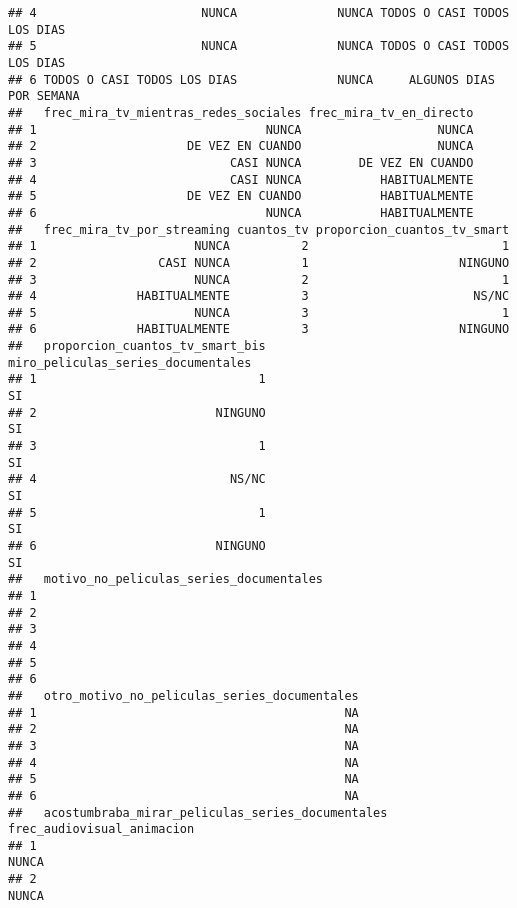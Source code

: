 \documentclass[
]{article}
\begin{document}
\begin{verbatim}
## 4                       NUNCA              NUNCA TODOS O CASI TODOS LOS DIAS
## 5                       NUNCA              NUNCA TODOS O CASI TODOS LOS DIAS
## 6 TODOS O CASI TODOS LOS DIAS              NUNCA     ALGUNOS DIAS POR SEMANA
##   frec_mira_tv_mientras_redes_sociales frec_mira_tv_en_directo
## 1                                NUNCA                   NUNCA
## 2                     DE VEZ EN CUANDO                   NUNCA
## 3                           CASI NUNCA        DE VEZ EN CUANDO
## 4                           CASI NUNCA           HABITUALMENTE
## 5                     DE VEZ EN CUANDO           HABITUALMENTE
## 6                                NUNCA           HABITUALMENTE
##   frec_mira_tv_por_streaming cuantos_tv proporcion_cuantos_tv_smart
## 1                      NUNCA          2                           1
## 2                 CASI NUNCA          1                     NINGUNO
## 3                      NUNCA          2                           1
## 4              HABITUALMENTE          3                       NS/NC
## 5                      NUNCA          3                           1
## 6              HABITUALMENTE          3                     NINGUNO
##   proporcion_cuantos_tv_smart_bis miro_peliculas_series_documentales
## 1                               1                                 SI
## 2                         NINGUNO                                 SI
## 3                               1                                 SI
## 4                           NS/NC                                 SI
## 5                               1                                 SI
## 6                         NINGUNO                                 SI
##   motivo_no_peliculas_series_documentales
## 1                                        
## 2                                        
## 3                                        
## 4                                        
## 5                                        
## 6                                        
##   otro_motivo_no_peliculas_series_documentales
## 1                                           NA
## 2                                           NA
## 3                                           NA
## 4                                           NA
## 5                                           NA
## 6                                           NA
##   acostumbraba_mirar_peliculas_series_documentales  frec_audiovisual_animacion
## 1                                                                        NUNCA
## 2                                                                        NUNCA

\end{verbatim}
\end{document}
